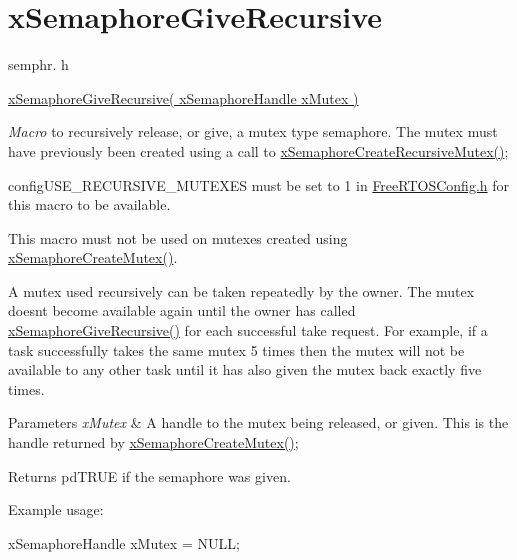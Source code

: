 \hypertarget{group__xSemaphoreGiveRecursive}{}\section{x\+Semaphore\+Give\+Recursive}
\label{group__xSemaphoreGiveRecursive}
semphr. h 
\begin{DoxyPre}\hyperlink{semphr_8h_a398d66b17856c22dd49d39aaac42f105}{xSemaphoreGiveRecursive( xSemaphoreHandle xMutex )}\end{DoxyPre}


{\itshape Macro} to recursively release, or \textquotesingle{}give\textquotesingle{}, a mutex type semaphore. The mutex must have previously been created using a call to \hyperlink{semphr_8h_a1bbc843be5a41ea83d2693b2189fc0f8}{x\+Semaphore\+Create\+Recursive\+Mutex()};

config\+U\+S\+E\+\_\+\+R\+E\+C\+U\+R\+S\+I\+V\+E\+\_\+\+M\+U\+T\+E\+X\+ES must be set to 1 in \hyperlink{FreeRTOSConfig_8h}{Free\+R\+T\+O\+S\+Config.\+h} for this macro to be available.

This macro must not be used on mutexes created using \hyperlink{semphr_8h_aa6a00aa9b91a9e5b3ebe4ae1c3f115c6}{x\+Semaphore\+Create\+Mutex()}.

A mutex used recursively can be \textquotesingle{}taken\textquotesingle{} repeatedly by the owner. The mutex doesn\textquotesingle{}t become available again until the owner has called \hyperlink{semphr_8h_a398d66b17856c22dd49d39aaac42f105}{x\+Semaphore\+Give\+Recursive()} for each successful \textquotesingle{}take\textquotesingle{} request. For example, if a task successfully \textquotesingle{}takes\textquotesingle{} the same mutex 5 times then the mutex will not be available to any other task until it has also \textquotesingle{}given\textquotesingle{} the mutex back exactly five times.


\begin{DoxyParams}{Parameters}
{\em x\+Mutex} & A handle to the mutex being released, or \textquotesingle{}given\textquotesingle{}. This is the handle returned by \hyperlink{semphr_8h_aa6a00aa9b91a9e5b3ebe4ae1c3f115c6}{x\+Semaphore\+Create\+Mutex()};\\
\hline
\end{DoxyParams}
\begin{DoxyReturn}{Returns}
pd\+T\+R\+UE if the semaphore was given.
\end{DoxyReturn}
Example usage\+: 
\begin{DoxyPre}
xSemaphoreHandle xMutex = NULL;\end{DoxyPre}



